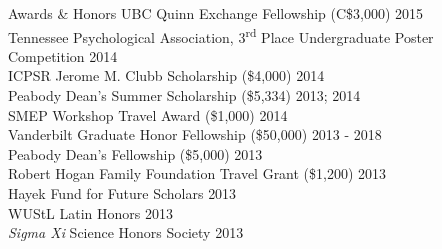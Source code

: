 \documentclass {resume}
\begin{document}
\begin{rSection}{\textrm{Awards \& Honors}}
UBC Quinn Exchange Fellowship (C\$3,000) \hfill{2015}\smallskip\\
Tennessee Psychological Association, 3\textsuperscript{rd} Place Undergraduate Poster Competition \hfill{2014}\smallskip\\
ICPSR Jerome M. Clubb Scholarship (\$4,000) \hfill{2014}\smallskip\\
Peabody Dean's Summer Scholarship (\$5,334)			    \hfill  {2013; 2014}\smallskip\\	
SMEP Workshop Travel Award (\$1,000) \hfill{2014}\smallskip\\
Vanderbilt Graduate Honor Fellowship (\$50,000)	\hfill  {2013 - 2018}\smallskip\\	
Peabody Dean's Fellowship (\$5,000)					\hfill  {2013}\smallskip\\
Robert Hogan Family Foundation Travel Grant (\$1,200) 	\hfill  {2013}\smallskip\\
Hayek Fund for Future Scholars                      \hfill  {2013}\smallskip\\
WUStL Latin Honors \hfill  {2013}\smallskip\\
\textit{Sigma Xi} Science Honors Society                    			\hfill  {2013}%
\end{rSection}
\end{document}
